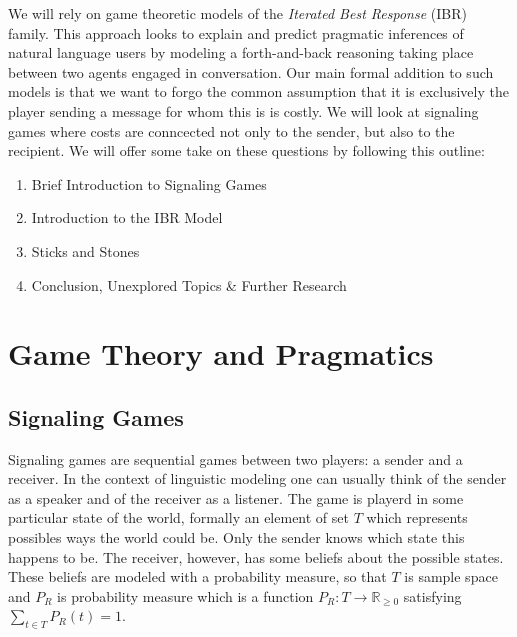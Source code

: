 \documentclass[10]{article}
\begin{document}
We will rely on game theoretic models of the \textit{Iterated Best Response} (IBR) family. This approach looks to explain and predict pragmatic inferences of natural language users by modeling a forth-and-back reasoning taking place between two agents engaged in conversation.
Our main formal addition to such models is that we want to forgo the common assumption that it is exclusively the player sending a message for whom this is is costly. We will look at signaling games where costs are conncected not only to the sender, but also to the recipient.
We will offer some take on these questions by following this outline:
\begin{enumerate} %
\item Brief Introduction to Signaling Games
\item Introduction to the IBR Model
\item Sticks and Stones
\item Conclusion, Unexplored Topics \& Further Research
\end{enumerate}

\section{Game Theory and Pragmatics}
\subsection{Signaling Games}
Signaling games are sequential games between two players: a sender and a receiver. In the context of linguistic modeling one can usually think of the sender as a speaker and of the receiver as a listener. The game is playerd in some particular state of the world, formally an element of set $T$ which represents possibles ways the world could be. Only the sender knows which state this happens to be. The receiver, however, has some beliefs about the possible states. These beliefs are modeled with a probability measure, so that $T$ is sample space and $P_R$ is probability measure which is a function $P_R: T\rightarrow \mathbb{R}_{\geq 0}$ satisfying $\sum_{t\in T}P_R(t)=1$.
\end{document}
